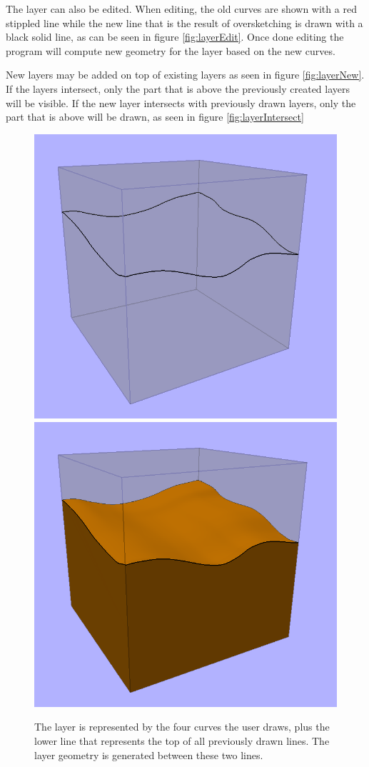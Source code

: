\documentclass[a4paper,12pt]{report}
\begin{document}
The layer can also be edited. When editing, the old curves are shown with a red stippled line while the new line that is the result of oversketching is drawn with a black solid line, as can be seen in figure \ref{fig:layerEdit}. Once done editing the program will compute new geometry for the layer based on the new curves.

New layers may be added on top of existing layers as seen in figure \ref{fig:layerNew}. If the layers intersect, only the part that is above the previously created layers will be visible. If the new layer intersects with previously drawn layers, only the part that is above will be drawn, as seen in figure \ref{fig:layerIntersect}

\begin{figure}
\includegraphics[width=.5\linewidth]{thesis/results/simpleLayerDraw.png}
\includegraphics[width=.5\linewidth]{thesis/results/simpleLayerCreate.png}
 \caption{The layer is represented by the four curves the user draws, plus the lower line that represents the top of all previously drawn lines. The layer geometry is generated between these two lines.}
 \label{fig:layerCreate}
\end{figure}
\end{document}
